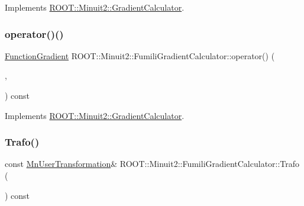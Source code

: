 Implements \mbox{\hyperlink{classROOT_1_1Minuit2_1_1GradientCalculator_a1809c1e8a89d32aabf7835e9690c2916}{R\+O\+O\+T\+::\+Minuit2\+::\+Gradient\+Calculator}}.

\mbox{\label{classROOT_1_1Minuit2_1_1FumiliGradientCalculator_a652f65091b404ebda9a645d7ba92b3b6}} 
\subsubsection{\texorpdfstring{operator()()}{operator()()}\hspace{0.1cm}{\footnotesize\ttfamily [6/6]}}
{\footnotesize\ttfamily \mbox{\hyperlink{classROOT_1_1Minuit2_1_1FunctionGradient}{Function\+Gradient}} R\+O\+O\+T\+::\+Minuit2\+::\+Fumili\+Gradient\+Calculator\+::operator() (\begin{DoxyParamCaption}\item[{const \mbox{\hyperlink{classROOT_1_1Minuit2_1_1MinimumParameters}{Minimum\+Parameters}} \&}]{,  }\item[{const \mbox{\hyperlink{classROOT_1_1Minuit2_1_1FunctionGradient}{Function\+Gradient}} \&}]{ }\end{DoxyParamCaption}) const\hspace{0.3cm}{\ttfamily [virtual]}}



Implements \mbox{\hyperlink{classROOT_1_1Minuit2_1_1GradientCalculator_a1809c1e8a89d32aabf7835e9690c2916}{R\+O\+O\+T\+::\+Minuit2\+::\+Gradient\+Calculator}}.

\mbox{\label{classROOT_1_1Minuit2_1_1FumiliGradientCalculator_a60672fa936f927ab01a7eb9ede6cb6e0}} 
\subsubsection{\texorpdfstring{Trafo()}{Trafo()}\hspace{0.1cm}{\footnotesize\ttfamily [1/3]}}
{\footnotesize\ttfamily const \mbox{\hyperlink{classROOT_1_1Minuit2_1_1MnUserTransformation}{Mn\+User\+Transformation}}\& R\+O\+O\+T\+::\+Minuit2\+::\+Fumili\+Gradient\+Calculator\+::\+Trafo (\begin{DoxyParamCaption}{ }\end{DoxyParamCaption}) const\hspace{0.3cm}{\ttfamily [inline]}}

